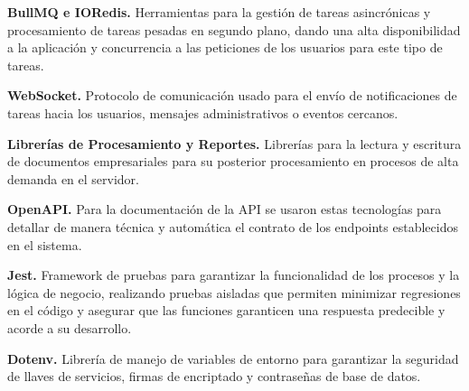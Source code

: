 \textbf{BullMQ e IORedis.} Herramientas para la gestión de tareas asincrónicas y procesamiento de tareas pesadas en segundo plano, 
    dando una alta disponibilidad a la aplicación y concurrencia a las peticiones de los usuarios para este tipo de tareas. \par

\textbf{WebSocket.} Protocolo de comunicación usado para el envío de notificaciones de tareas hacia los usuarios, 
    mensajes administrativos o eventos cercanos. \par

\textbf{Librerías de Procesamiento y Reportes.} Librerías para la lectura y escritura de documentos empresariales 
    para su posterior procesamiento en procesos de alta demanda en el servidor. \par

\textbf{OpenAPI.} Para la documentación de la API se usaron estas tecnologías para detallar de manera técnica y 
    automática el contrato de los endpoints establecidos en el sistema. \par

\textbf{Jest.} Framework de pruebas para garantizar la funcionalidad de los procesos y la lógica de negocio, 
    realizando pruebas aisladas que permiten minimizar regresiones en el código y asegurar que las funciones garanticen una respuesta predecible y acorde a su desarrollo. \par

\textbf{Dotenv.} Librería de manejo de variables de entorno para garantizar la seguridad de llaves de servicios, 
    firmas de encriptado y contraseñas de base de datos.\par

